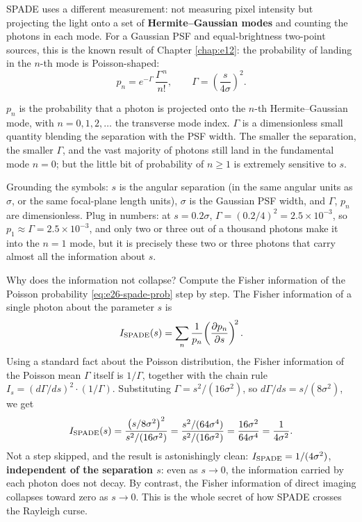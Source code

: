 SPADE uses a different measurement: not measuring pixel intensity but projecting the light onto a set of \textbf{Hermite--Gaussian modes} and counting the photons in each mode. For a Gaussian PSF and equal-brightness two-point sources, this is the known result of Chapter \ref{chap:e12}: the probability of landing in the \(n\)-th mode is Poisson-shaped:
\begin{equation}
  p_n=e^{-\Gamma}\,\frac{\Gamma^{\,n}}{n!},\qquad
  \Gamma=\left(\frac{s}{4\sigma}\right)^{\!2}.
  \label{eq:e26-spade-prob}
\end{equation}
\begin{formulaexplain}
\(p_n\) is the probability that a photon is projected onto the \(n\)-th Hermite--Gaussian mode, with \(n=0,1,2,\dots\) the transverse mode index. \(\Gamma\) is a dimensionless small quantity blending the separation with the PSF width. The smaller the separation, the smaller \(\Gamma\), and the vast majority of photons still land in the fundamental mode \(n=0\); but the little bit of probability of \(n\ge1\) is extremely sensitive to \(s\).
\end{formulaexplain}
Grounding the symbols: \(s\) is the angular separation (in the same angular units as \(\sigma\), or the same focal-plane length units), \(\sigma\) is the Gaussian PSF width, and \(\Gamma\), \(p_n\) are dimensionless. Plug in numbers: at \(s=0.2\sigma\), \(\Gamma=(0.2/4)^2=2.5\times10^{-3}\), so \(p_1\approx\Gamma=2.5\times10^{-3}\), and only two or three out of a thousand photons make it into the \(n=1\) mode, but it is precisely these two or three photons that carry almost all the information about \(s\).

Why does the information not collapse? Compute the Fisher information of the Poisson probability \eqref{eq:e26-spade-prob} step by step. The Fisher information of a single photon about the parameter \(s\) is
\[
  I_{\rm SPADE}(s)=\sum_{n}\frac{1}{p_n}\!\left(\frac{\partial p_n}{\partial s}\right)^{\!2}.
\]
Using a standard fact about the Poisson distribution, the Fisher information of the Poisson mean \(\Gamma\) itself is \(1/\Gamma\), together with the chain rule \(I_s=(d\Gamma/ds)^2\cdot(1/\Gamma)\). Substituting \(\Gamma=s^2/(16\sigma^2)\), so \(d\Gamma/ds=s/(8\sigma^2)\), we get
\[
  I_{\rm SPADE}(s)=\frac{\big(s/8\sigma^2\big)^2}{s^2/(16\sigma^2)}
  =\frac{s^2/(64\sigma^4)}{s^2/(16\sigma^2)}=\frac{16\sigma^2}{64\sigma^4}=\frac{1}{4\sigma^2}.
\]
Not a step skipped, and the result is astonishingly clean: \(I_{\rm SPADE}=1/(4\sigma^2)\), \textbf{independent of the separation \(s\)}: even as \(s\to0\), the information carried by each photon does not decay. By contrast, the Fisher information of direct imaging collapses toward zero as \(s\to0\). This is the whole secret of how SPADE crosses the Rayleigh curse.

